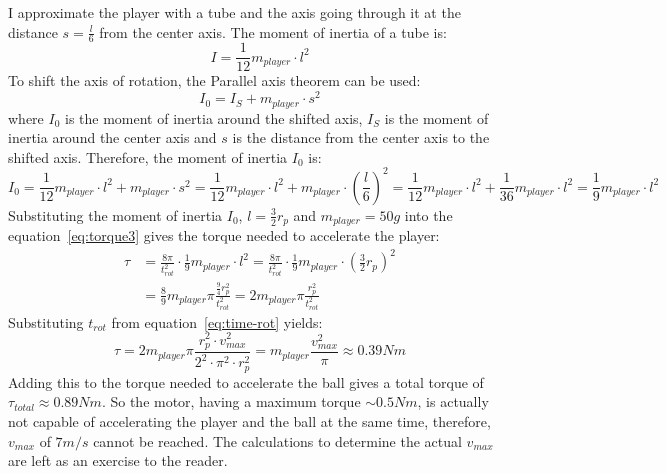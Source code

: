 I approximate the player with a tube and the axis going through it at the distance $s=\frac{l}{6}$ from the center axis.
The moment of inertia of a tube is:
\begin{equation}
    \label{eq:moment_of_inertia}
    I = \frac{1}{12} m_{player} \cdot l^2
\end{equation}
To shift the axis of rotation, the Parallel axis theorem can be used:
\begin{equation}
    \label{eq:parallel_axis_theorem}
    I_0 = I_{S} + m_{player} \cdot s^2
\end{equation}
where $I_0$ is the moment of inertia around the shifted axis, $I_{S}$ is the moment of inertia around the center axis and $s$ is the distance from the center axis to the shifted axis.
Therefore, the moment of inertia $I_0$ is:
\begin{equation}
    \label{eq:moment_of_inertia_shifted}
    I_0 = \frac{1}{12} m_{player} \cdot l^2 + m_{player} \cdot s^2 = \frac{1}{12} m_{player} \cdot l^2 + m_{player} \cdot \left(\frac{l}{6}\right)^2 = \frac{1}{12} m_{player} \cdot l^2 + \frac{1}{36} m_{player} \cdot l^2 = \frac{1}{9} m_{player} \cdot l^2
\end{equation}
Substituting the moment of inertia $I_0$, $l=\frac{3}{2}r_p$ and $m_{player}=50g$ into the equation~\ref{eq:torque3} gives the torque needed to accelerate the player:
\begin{equation}
    \label{eq:torque4}
    \begin{split}
        \tau &= \frac{8\pi}{t_{rot}^2} \cdot \frac{1}{9} m_{player} \cdot l^2 = \frac{8\pi}{t_{rot}^2} \cdot \frac{1}{9} m_{player} \cdot \left(\frac{3}{2}r_p\right)^2\\
        &= \frac{8}{9}m_{player}\pi\frac{\frac{9}{4}r_p^2}{t_{rot}^2}=2m_{player}\pi\frac{r_p^2}{t_{rot}^2}
    \end{split}
\end{equation}
Substituting $t_{rot}$ from equation~\ref{eq:time-rot} yields:
\begin{equation}
    \label{eq:torque5}
    \tau = 2m_{player}\pi\frac{r_p^2\cdot v_{max}^2}{2^{2} \cdot \pi^{2} \cdot r_p^2} = m_{player}\frac{v_{max}^2}{\pi} \approx 0.39Nm
\end{equation}
Adding this to the torque needed to accelerate the ball gives a total torque of $\tau_{total} \approx 0.89Nm$.
So the motor, having a maximum torque $\sim0.5Nm$, is actually not capable of accelerating the player and the ball at the same time, therefore, $v_{max}$ of $7m/s$ cannot be reached.
The calculations to determine the actual $v_{max}$ are left as an exercise to the reader.


